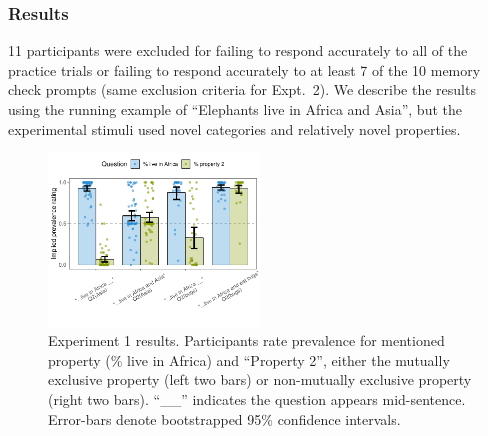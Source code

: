 \documentclass[10pt,letterpaper]{article}
\newcommand{\mh}[1]{{\textcolor{Blue}{[mh: #1]}}}
\begin{document}




\subsubsection{Results}





11 participants were excluded for failing to respond accurately to all of the practice trials or  failing to respond accurately to at least 7 of the 10 memory check prompts (same exclusion criteria for Expt.~2).
We describe the results using the running example of ``Elephants live in Africa and Asia'', but the experimental stimuli used novel categories and relatively novel properties.
 \vspace{-0.5cm}
 \begin{figure}[h]
  \centering
    \includegraphics[width=0.5\textwidth]{expt2_summary}
    \vspace{-1.5cm}
  \caption{Experiment 1 results.  Participants rate prevalence for mentioned property (\% live in Africa) and ``Property 2'', either the mutually exclusive property (left two bars) or non-mutually exclusive property (right two bars). ``\_\_'' indicates the question appears mid-sentence. Error-bars denote bootstrapped 95\% confidence intervals.}
  \label{fig:expt2}
          \vspace{-0.5cm}
  \end{figure}
 
\end{document}
